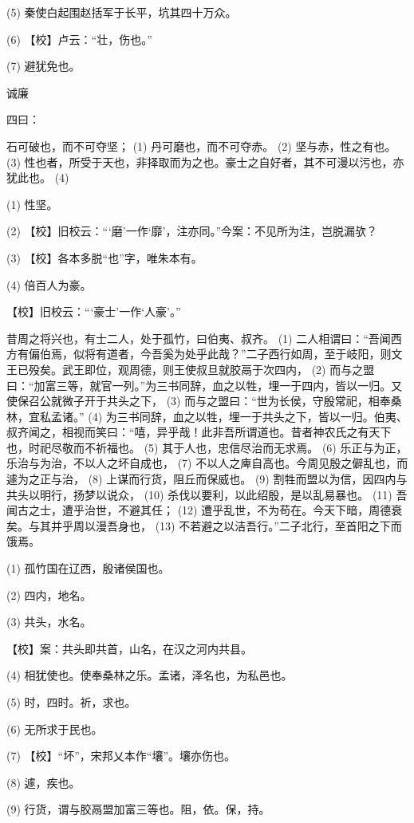 \documentclass[12pt,UTF8]{ctexbook}
\begin{document}
(5) 秦使白起围赵括军于长平，坑其四十万众。

(6) 【校】卢云：“壮，伤也。”

(7) 避犹免也。





诚廉


四曰：

石可破也，而不可夺坚； (1) 丹可磨也，而不可夺赤。 (2) 坚与赤，性之有也。 (3) 性也者，所受于天也，非择取而为之也。豪士之自好者，其不可漫以污也，亦犹此也。 (4)

(1) 性坚。

(2) 【校】旧校云：“‘磨’一作‘靡’，注亦同。”今案：不见所为注，岂脱漏欤？

(3) 【校】各本多脱“也”字，唯朱本有。

(4) 倍百人为豪。

【校】旧校云：“‘豪士’一作‘人豪’。”

昔周之将兴也，有士二人，处于孤竹，曰伯夷、叔齐。 (1) 二人相谓曰：“吾闻西方有偏伯焉，似将有道者，今吾奚为处乎此哉？”二子西行如周，至于岐阳，则文王已殁矣。武王即位，观周德，则王使叔旦就胶鬲于次四内， (2) 而与之盟曰：“加富三等，就官一列。”为三书同辞，血之以牲，埋一于四内，皆以一归。又使保召公就微子开于共头之下， (3) 而与之盟曰：“世为长侯，守殷常祀，相奉桑林，宜私孟诸。” (4) 为三书同辞，血之以牲，埋一于共头之下，皆以一归。伯夷、叔齐闻之，相视而笑曰：“嘻，异乎哉！此非吾所谓道也。昔者神农氏之有天下也，时祀尽敬而不祈福也。 (5) 其于人也，忠信尽治而无求焉。 (6) 乐正与为正，乐治与为治，不以人之坏自成也， (7) 不以人之庳自高也。今周见殷之僻乱也，而遽为之正与治， (8) 上谋而行货，阻丘而保威也。 (9) 割牲而盟以为信，因四内与共头以明行，扬梦以说众， (10) 杀伐以要利，以此绍殷，是以乱易暴也。 (11) 吾闻古之士，遭乎治世，不避其任； (12) 遭乎乱世，不为苟在。今天下暗，周德衰矣。与其并乎周以漫吾身也， (13) 不若避之以洁吾行。”二子北行，至首阳之下而饿焉。

(1) 孤竹国在辽西，殷诸侯国也。

(2) 四内，地名。

(3) 共头，水名。

【校】案：共头即共首，山名，在汉之河内共县。

(4) 相犹使也。使奉桑林之乐。孟诸，泽名也，为私邑也。

(5) 时，四时。祈，求也。

(6) 无所求于民也。

(7) 【校】“坏”，宋邦乂本作“壤”。壤亦伤也。

(8) 遽，疾也。

(9) 行货，谓与胶鬲盟加富三等也。阻，依。保，持。
\end{document}

